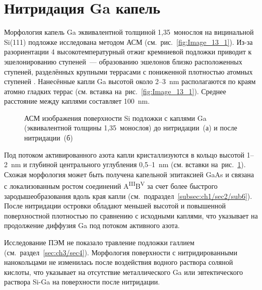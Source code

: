 \section{Нитридация Ga капель}\label{sec:ch3/sec2}

Морфология капель Ga эквивалентной толщиной 1,35~монослоя на вицинальной
Si(111) подложке исследована методом АСМ (см.~рис.~\cref{fig:Image_13_1}).
Из-за разориентации 4{\textdegree} высокотемпературный отжиг кремниевой
подложки приводит к эшелонированию ступеней~--- образованию эшелонов близко
расположенных ступеней, разделённых крупными террасами с пониженной плотностью
атомных ступеней \cite{Latyshev1998, Hibino1994}. Нанесённые капли Ga высотой
около 2--3~\si{\nano\meter} располагаются по краям атомно гладких террас (см.
вставка на~рис.~\cref{fig:Image_13_1}). Среднее расстояние между каплями
составляет 100~\si{\nano\meter}.

\begin{figure}[ht] 
				\caption{АСМ изображения поверхности Si подложки с каплями Ga
			(эквивалентной толщины 1,35~монослоя) до нитридации~(а) и после
	нитридации~(б)}\label{fig:Image_13} \end{figure}

Под потоком активированного азота капли кристаллизуются в кольцо высотой
1--2~\si{\nano\meter} и глубиной центрального углубления
0,5--1~\si{\nano\meter} (см. вставки на~рис.~\cref{fig:Image_13}). Схожая
морфология может быть получена капельной эпитаксией GaAs \cite{Zhou2013} и
связана с локализованным ростом соединений
A\textsuperscript{III}B\textsuperscript{V} за счет более быстрого
зародышеобразования вдоль края капли
(см.~подраздел~\cref{subsec:ch1/sec2/sub6}). После нитридации островки обладают
меньшей высотой и повышенной поверхностной плотностью по сравнению с исходными
каплями, что указывает на продолжение диффузия Ga под потоком активного азота.

Исследование ПЭМ не показало травление подложки галлием
(см.~раздел~\cref{sec:ch3/sec4}). Морфология поверхности с нитридированными
нанокольцами не изменилась после воздействия водного раствора соляной кислоты,
что указывает на отсутствие металлического Ga или эвтектического раствора Si-Ga
на поверхности после нитридации.

